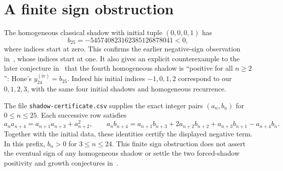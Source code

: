 \documentclass[11pt]{article}
\begin{document}
\section{A finite sign obstruction}
The homogeneous classical shadow with initial tuple $(0,0,0,1)$
has
\[
 b_{25}=-545740823162385126878041<0,
\]
where indices start at zero. This confirms the earlier negative-sign
observation in~\cite[Section~2.1, p.~3]{OT}, whose indices start at one.
It also gives an explicit counterexample to the later conjecture
in~\cite[Example~3.8]{Hone} that the fourth homogeneous shadow is
``positive for all $n\ge2$'': Hone's $y^{(\mathrm{iv})}_{24}=b_{25}$.
Indeed his initial indices $-1,0,1,2$ correspond to our $0,1,2,3$,
with the same four initial shadows and homogeneous recurrence.

The file \texttt{shadow-certificate.csv} supplies the exact integer
pairs $(a_n,b_n)$ for $0\le n\le25$. Each successive row satisfies
\[
 a_na_{n+4}=a_{n+1}a_{n+3}+a_{n+2}^2,\qquad
 a_nb_{n+4}=a_{n+1}b_{n+3}+2a_{n+2}b_{n+2}
 +a_{n+3}b_{n+1}-a_{n+4}b_n.
\]
Together with the initial data, these identities certify the displayed
negative term. In this prefix, $b_n>0$ for $3\le n\le24$.
This finite sign obstruction does not assert the eventual sign of any
homogeneous shadow or settle the two forced-shadow positivity and
growth conjectures in~\cite[Section~2.2]{OT}.

\clearpage
\end{document}
